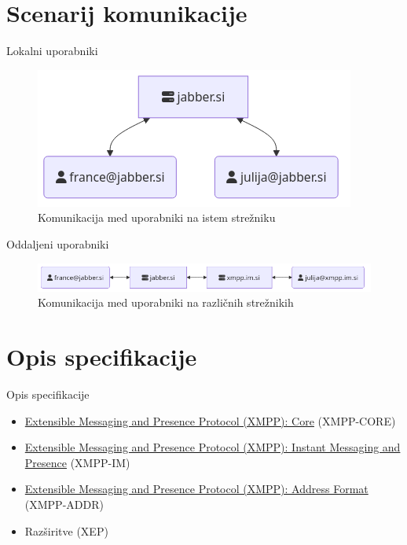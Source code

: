 \documentclass[presentation]{beamer}
\begin{document}
\section{Scenarij komunikacije}
\label{sec:orgd6a8cb5}

\begin{frame}[label={sec:org3fb5006}]{Lokalni uporabniki}
\begin{figure}[H]
\centering
\includegraphics[width=.9\linewidth]{images/local-server.png}
\caption{\label{fig:org3e789db}Komunikacija med uporabniki na istem strežniku}
\end{figure}
\end{frame}

\begin{frame}[label={sec:orge1a6f66}]{Oddaljeni uporabniki}
\begin{figure}[H]
\centering
\includegraphics[width=.9\linewidth]{images/cross-server.png}
\caption{\label{fig:orgeb5874d}Komunikacija med uporabniki na različnih strežnikih}
\end{figure}
\end{frame}

\section{Opis specifikacije}
\label{sec:orgf16b136}

\begin{frame}[label={sec:orgb116f60}]{Opis specifikacije}
\begin{itemize}
\item \href{https://datatracker.ietf.org/doc/rfc6120/}{Extensible Messaging and Presence Protocol (XMPP): Core} (XMPP-CORE)
\item \href{https://datatracker.ietf.org/doc/rfc6121/}{Extensible Messaging
and Presence Protocol (XMPP): Instant Messaging and Presence}
(XMPP-IM)
\item \href{https://datatracker.ietf.org/doc/rfc7622/}{Extensible Messaging and Presence Protocol (XMPP): Address Format}
(XMPP-ADDR)
\item Razširitve (XEP)
\end{itemize}
\end{frame}
\end{document}
